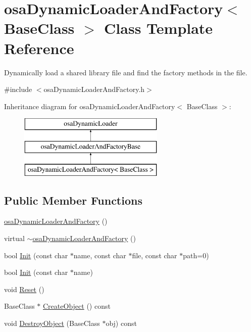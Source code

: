 \hypertarget{classosa_dynamic_loader_and_factory}{}\section{osa\+Dynamic\+Loader\+And\+Factory$<$ Base\+Class $>$ Class Template Reference}
\label{classosa_dynamic_loader_and_factory}


Dynamically load a shared library file and find the factory methods in the file.  




{\ttfamily \#include $<$osa\+Dynamic\+Loader\+And\+Factory.\+h$>$}

Inheritance diagram for osa\+Dynamic\+Loader\+And\+Factory$<$ Base\+Class $>$\+:\begin{figure}[H]
\begin{center}
\leavevmode
\includegraphics[height=3.000000cm]{da/d80/classosa_dynamic_loader_and_factory}
\end{center}
\end{figure}
\subsection*{Public Member Functions}
\begin{DoxyCompactItemize}
\item 
\hyperlink{classosa_dynamic_loader_and_factory_a62c5ebb6a73695309d35e234c5364aca}{osa\+Dynamic\+Loader\+And\+Factory} ()
\item 
virtual \hyperlink{classosa_dynamic_loader_and_factory_a89a5ed41795886528c8be5174b414eb0}{$\sim$osa\+Dynamic\+Loader\+And\+Factory} ()
\item 
bool \hyperlink{classosa_dynamic_loader_and_factory_ad8fe0ce199004dc602e8e2c445aedd1a}{Init} (const char $\ast$name, const char $\ast$file, const char $\ast$path=0)
\item 
bool \hyperlink{classosa_dynamic_loader_and_factory_a8cf38f618bf61e039dbc9eef49897900}{Init} (const char $\ast$name)
\item 
void \hyperlink{classosa_dynamic_loader_and_factory_a99c410f1a99f8b332a5741e6f86bb467}{Reset} ()
\item 
Base\+Class $\ast$ \hyperlink{classosa_dynamic_loader_and_factory_a5d98120e99e856ede533caeb4497ec0e}{Create\+Object} () const 
\item 
void \hyperlink{classosa_dynamic_loader_and_factory_a395ef97059b8b948cfa040a15644857e}{Destroy\+Object} (Base\+Class $\ast$obj) const 
\end{DoxyCompactItemize}
